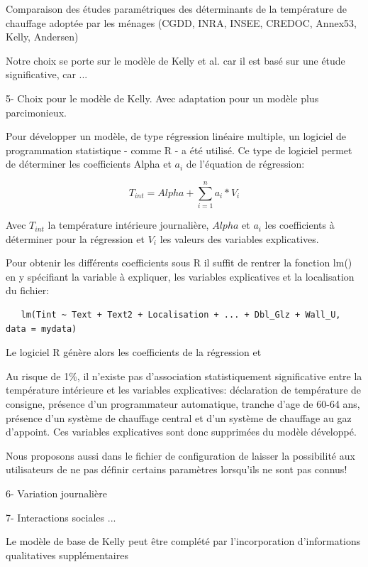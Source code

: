 Comparaison des études paramétriques des déterminants de la température de chauffage adoptée par les ménages (CGDD, INRA, INSEE, CREDOC, Annex53, Kelly, Andersen)

Notre choix se porte sur le modèle de Kelly et al. car il est basé sur une étude significative, car ...

5- Choix pour le modèle de Kelly. Avec adaptation pour un modèle plus parcimonieux.

Pour développer un modèle, de type régression linéaire multiple, un logiciel de programmation statistique - comme R - a été utilisé. Ce type de logiciel permet de déterminer les coefficients Alpha et $a_{i}$ de l'équation de régression:

\begin{equation}
T_{int} = Alpha + \sum\limits_{i=1}^n a_{i} * V_{i} 
\end{equation}

Avec $T_{int}$ la température intérieure journalière, $Alpha$ et $a_{i}$ les coefficients à déterminer pour la régression et $V_{i}$ les valeurs des variables explicatives.

Pour obtenir les différents coefficients sous R il suffit de rentrer la fonction lm() en y spécifiant la variable à expliquer, les variables explicatives et la localisation du fichier:
\begin{verbatim}
   lm(Tint ~ Text + Text2 + Localisation + ... + Dbl_Glz + Wall_U, data = mydata)
\end{verbatim}

Le logiciel R génère alors les coefficients de la régression et 

Au risque de 1\%, il n'existe pas d'association statistiquement significative entre la température intérieure et les variables explicatives: déclaration de température de consigne, présence d'un programmateur automatique, tranche d'age de 60-64 ans, présence d'un système de chauffage central et d'un système de chauffage au gaz d'appoint. Ces variables explicatives sont donc supprimées du modèle développé.

Nous proposons aussi dans le fichier de configuration de laisser la possibilité aux utilisateurs de ne pas définir certains paramètres lorsqu'ils ne sont pas connus!

6- Variation journalière



7- Interactions sociales ...

Le modèle de base de Kelly peut être complété par l'incorporation d'informations qualitatives supplémentaires

